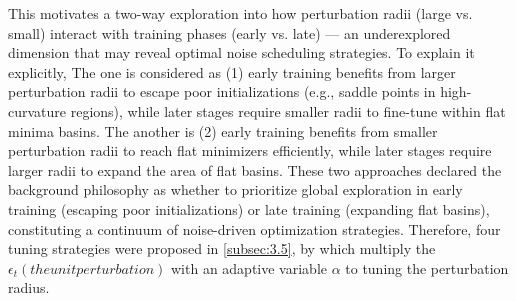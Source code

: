 \documentclass[10pt,twocolumn,letterpaper]{article}
\begin{document}
This motivates a two-way exploration into how perturbation radii (large vs. small) interact with training phases (early vs. late) — an underexplored dimension that may reveal optimal noise scheduling strategies. To explain it explicitly, The one is considered as (1) early training benefits from larger perturbation radii to escape poor initializations (e.g., saddle points in high-curvature regions), while later stages require smaller radii to fine-tune within flat minima basins. The another is (2) early training benefits from smaller perturbation radii to reach flat minimizers efficiently, while later stages require larger radii to expand the area of flat basins. These two approaches declared the background philosophy as whether to prioritize global exploration in early training (escaping poor initializations) or late training (expanding flat basins), constituting a continuum of noise-driven optimization strategies. Therefore, four tuning strategies were proposed in \ref{subsec:3.5}, by which multiply the $\epsilon_{t} (the unit perturbation)$ with an adaptive variable $\alpha$ to tuning the perturbation radius.
\end{document}
